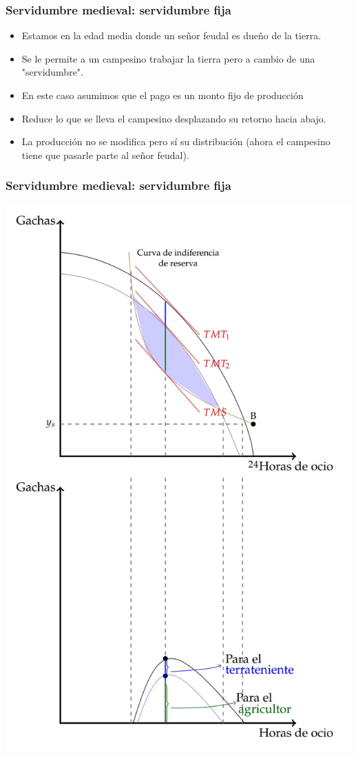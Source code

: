 \documentclass{beamer}
\begin{document}
\begin{frame}
\frametitle{Servidumbre medieval: servidumbre fija }
\begin{itemize}
    \item Estamos en la edad media donde un señor feudal es dueño de la tierra. 
\item Se le permite a un campesino trabajar la tierra pero a cambio de una "servidumbre". 
    \item  En este caso asumimos que el pago es un monto fijo de producción 
    \item Reduce lo que se lleva el campesino desplazando su retorno hacia abajo.
    \item La producción no se modifica pero sí su distribución (ahora el campesino tiene que pasarle parte al señor feudal). 
\end{itemize}
\end{frame}

\begin{frame}
\frametitle{Servidumbre medieval: servidumbre fija }
\centering
\includegraphics[scale=0.55]{Slides Principios de Economia/Figures/Instituciones3.jpg}
\end{frame}
\end{document}
